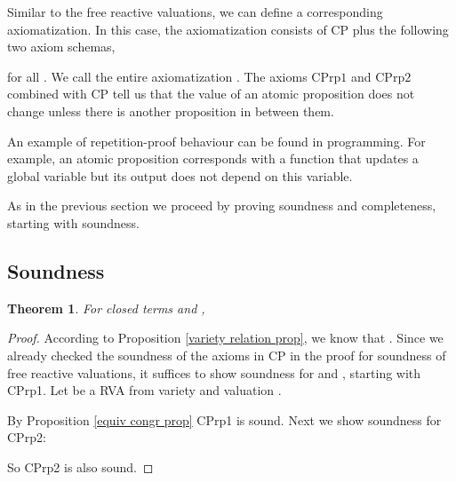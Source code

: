 \documentclass[a4paper,twoside,openright]{report}
\newcommand{\CPrp}[1]{\ensuremath{\mathrm{CPrp#1}}}
\newtheorem{thm}[theorem]{Theorem}
\begin{document}
Similar to the free reactive valuations, we can define a corresponding axiomatization. In this case, the axiomatization consists of CP plus the following two axiom schemas,

for all . We call the entire axiomatization .
The axioms \CPrp1 and \CPrp2 combined with CP tell us that the value of an atomic proposition  does not change unless there is another proposition in between them.

An example of repetition-proof behaviour can be found in programming. For example, an atomic proposition corresponds with a function that updates a global variable but its output does not depend on this variable.




As in the previous section we proceed by proving soundness and completeness, starting with soundness.

\subsection{Soundness}

\begin{thm}
For closed terms  and ,

\end{thm}
\begin{proof}
According to Proposition \ref{variety relation prop}, we know that . Since we already checked the soundness of the axioms in CP in the proof for soundness of free reactive valuations, it suffices to show soundness for  and , starting with CPrp1. Let  be a RVA from variety  and valuation .


By Proposition \ref{equiv congr prop} CPrp1 is sound. Next we show soundness for CPrp2:


So CPrp2 is also sound.
\end{proof}
\end{document}

